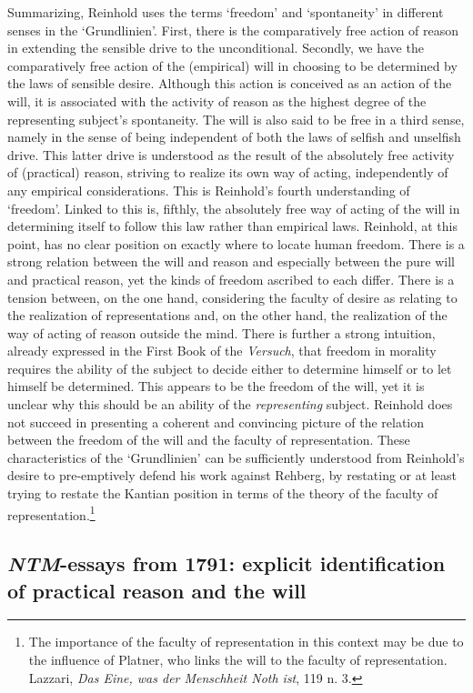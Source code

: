  Summarizing, Reinhold uses the terms `freedom' and `spontaneity' in different senses in the `Grundlinien'. First, there is the comparatively free action of reason in extending the sensible drive to the unconditional. Secondly, we have the comparatively free action of the (empirical) will in choosing to be determined by the laws of sensible desire. Although this action is conceived as an action of the will, it is associated with the activity of reason as the highest degree of the representing subject's spontaneity. The will is also said to be free in a third sense, namely in the sense of being independent of both the laws of selfish and unselfish drive. This latter drive is understood as the result of the absolutely free activity of (practical) reason, striving to realize its own way of acting, independently of any empirical considerations. This is Reinhold's fourth understanding of `freedom'. Linked to this is, fifthly, the absolutely free way of acting of the will in determining itself to follow this law rather than empirical laws. Reinhold, at this point, has no clear position on exactly where to locate human freedom. There is a strong relation between the will and reason and especially between the pure will and practical reason, yet the kinds of freedom ascribed to each differ. There is a tension between, on the one hand, considering the faculty of desire as relating to the realization of representations and, on the other hand, the realization of the way of acting of reason outside the mind. There is further a strong intuition, already expressed in the First Book of the \textit{Versuch}, that freedom in morality requires the ability of the subject to decide either to determine himself or to let himself be determined. This appears to be the freedom of the will, yet it is unclear why this should be an ability of the \textit{representing} subject. Reinhold does not succeed in presenting a coherent and convincing picture of the relation between the freedom of the will and the faculty of representation. These characteristics of the `Grundlinien' can be sufficiently understood from Reinhold's desire to pre{-}emptively defend his work against Rehberg, by restating or at least trying to restate the Kantian position in terms of the theory of the faculty of representation.\footnote{ The importance of the faculty of representation in this context may be due to the influence of Platner, who links the will to the faculty of representation. Lazzari, \textit{Das Eine, was der Menschheit Noth ist}, 119 n. 3. }


\subsection{\textit{NTM}{-}essays from 1791: explicit identification of practical reason and the will}



